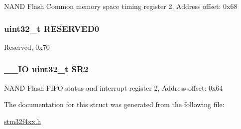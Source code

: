 N\-A\-N\-D Flash Common memory space timing register 2, Address offset\-: 0x68 \hypertarget{struct_f_s_m_c___bank2___type_def_af86c61a5d38a4fc9cef942a12744486b}{
\subsubsection[{R\-E\-S\-E\-R\-V\-E\-D0}]{\setlength{\rightskip}{0pt plus 5cm}uint32\-\_\-t R\-E\-S\-E\-R\-V\-E\-D0}}\label{struct_f_s_m_c___bank2___type_def_af86c61a5d38a4fc9cef942a12744486b}
Reserved, 0x70 \hypertarget{struct_f_s_m_c___bank2___type_def_a89623ee198737b29dc0a803310605a83}{
\subsubsection[{S\-R2}]{\setlength{\rightskip}{0pt plus 5cm}\-\_\-\-\_\-\-I\-O uint32\-\_\-t S\-R2}}\label{struct_f_s_m_c___bank2___type_def_a89623ee198737b29dc0a803310605a83}
N\-A\-N\-D Flash F\-I\-F\-O status and interrupt register 2, Address offset\-: 0x64 

The documentation for this struct was generated from the following file\-:\begin{DoxyCompactItemize}
\item 
\hyperlink{stm32f4xx_8h}{stm32f4xx.\-h}\end{DoxyCompactItemize}
